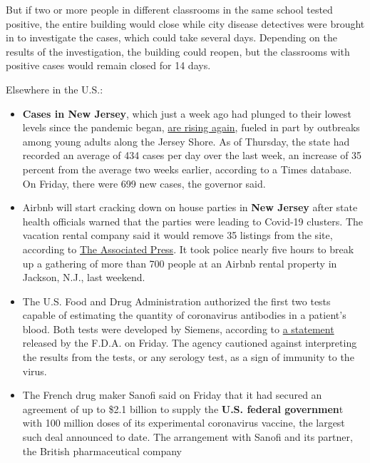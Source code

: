 But if two or more people in different classrooms in the same school
tested positive, the entire building would close while city disease
detectives were brought in to investigate the cases, which could take
several days. Depending on the results of the investigation, the
building could reopen, but the classrooms with positive cases would
remain closed for 14 days.

Elsewhere in the U.S.:

\begin{itemize}
\item
  \textbf{Cases in New Jersey}, which just a week ago had plunged to
  their lowest levels since the pandemic began,
  \href{https://www.nytimes.com/2020/07/30/nyregion/coronavirus-cases-nj.html}{are
  rising again}, fueled in part by outbreaks among young adults along
  the Jersey Shore. As of Thursday, the state had recorded an average of
  434 cases per day over the last week, an increase of 35 percent from
  the average two weeks earlier, according to a Times database. On
  Friday, there were 699 new cases, the governor said.
\item
  Airbnb will start cracking down on house parties in \textbf{New
  Jersey} after state health officials warned that the parties were
  leading to Covid-19 clusters. The vacation rental company said it
  would remove 35 listings from the site, according to
  \href{https://apnews.com/c64053bb7f7b60001a314526da06732e}{The
  Associated Press}. It took police nearly five hours to break up a
  gathering of more than 700 people at an Airbnb rental property in
  Jackson, N.J., last weekend.
\item
  The U.S. Food and Drug Administration authorized the first two tests
  capable of estimating the quantity of coronavirus antibodies in a
  patient's blood. Both tests were developed by Siemens, according to
  \href{https://www.fda.gov/news-events/press-announcements/coronavirus-covid-19-update-fda-authorizes-first-tests-estimate-patients-antibodies-past-sars-cov-2}{a
  statement} released by the F.D.A. on Friday. The agency cautioned
  against interpreting the results from the tests, or any serology test,
  as a sign of immunity to the virus.
\item
  The French drug maker Sanofi said on Friday that it had secured an
  agreement of up to \$2.1 billion to supply the \textbf{U.S. federal
  governmen}t with 100 million doses of its experimental coronavirus
  vaccine, the largest such deal announced to date. The arrangement with
  Sanofi and its partner, the British pharmaceutical company

\end{itemize}
